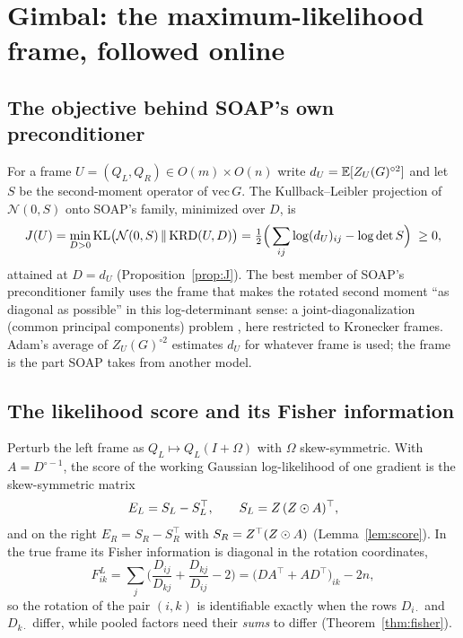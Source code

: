 \section{Gimbal: the maximum-likelihood frame, followed online}
\label{sec:method}

\subsection{The objective behind SOAP's own preconditioner}
For a frame $U=(Q_L,Q_R)\in O(m)\times O(n)$ write $d_U=\mathbb{E}[Z_U(G)^{\circ2}]$ and let $S$ be the
second-moment operator of $\mathrm{vec}\,G$. The Kullback--Leibler projection of $\mathcal N(0,S)$
onto SOAP's family, minimized over $D$, is
\begin{equation}
  J(U)=\min_{D>0}\mathrm{KL}\big(\mathcal N(0,S)\,\|\,\mathrm{KRD}(U,D)\big)
      =\tfrac12\Big(\sum_{ij}\log(d_U)_{ij}-\log\det S\Big)\;\ge0,
  \label{eq:J}
\end{equation}
attained at $D=d_U$ (Proposition~\ref{prop:J}). The best member of SOAP's preconditioner family
uses the frame that makes the rotated second moment ``as diagonal as possible'' in this
log-determinant sense: a joint-diagonalization (common principal components) problem
\citep{flury1984cpc,pham2001joint}, here restricted to Kronecker frames. Adam's average of
$Z_U(G)^{\circ2}$ estimates $d_U$ for whatever frame is used; the frame is the part SOAP takes
from another model.

\subsection{The likelihood score and its Fisher information}
Perturb the left frame as $Q_L\mapsto Q_L(I+\Omega)$ with $\Omega$ skew-symmetric. With
$A=D^{\circ-1}$, the score of the working Gaussian log-likelihood of one gradient is the
skew-symmetric matrix
\begin{equation}
  E_L=S_L-S_L^\top,\qquad S_L=Z\,(Z\odot A)^\top ,
  \label{eq:score}
\end{equation}
and on the right $E_R=S_R-S_R^\top$ with $S_R=Z^\top(Z\odot A)$ (Lemma~\ref{lem:score}). In the
true frame its Fisher information is diagonal in the rotation coordinates,
\begin{equation}
  F^L_{ik}=\sum_j\Big(\frac{D_{ij}}{D_{kj}}+\frac{D_{kj}}{D_{ij}}-2\Big)
  =\big(DA^\top+AD^\top\big)_{ik}-2n ,
  \label{eq:fisher}
\end{equation}
so the rotation of the pair $(i,k)$ is identifiable exactly when the rows $D_{i\cdot}$ and
$D_{k\cdot}$ differ, while pooled factors need their \emph{sums} to differ (Theorem~\ref{thm:fisher}).

